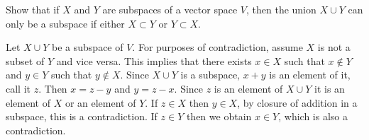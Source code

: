\documentclass[../../main.tex]{subfiles}
\begin{document}
\begin{problem}
	Show that if $X$ and $Y$ are subspaces of a vector space $V$, then the union $X \cup Y$ can only be a subspace if either $X \subset Y$ or $Y \subset X$.
\end{problem}
\begin{solution}
	Let $X \cup Y$ be a subspace of $V$. For purposes of contradiction, assume $X$ is not a subset of $Y$ and vice versa. This implies that there exists $x \in X$ such that $x \notin Y$ and $y \in Y$ such that $y \notin X$. Since $X \cup Y$ is a subspace, $x+y$ is an element of it, call it $z$. Then $x = z -y$ and $y = z - x$. Since $z$ is an element of $X \cup Y$ it is an element of $X$ or an element of $Y$. If $z \in X$ then $y \in X$, by closure of addition in a subspace, this is a contradiction. If $z \in Y$ then we obtain $x \in Y$, which is also a contradiction.
\end{solution}
\end{document}
